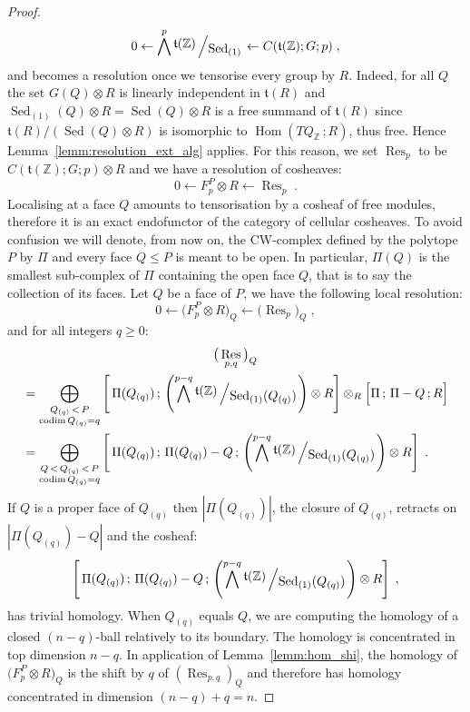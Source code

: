 \documentclass[AHL,Unicode,longabstracts,published]{cedram}
\newcommand{\bigslant}[2]{{\raisebox{.2em}{$#1$}\left/\raisebox{-.2em}{$#2$}\right.}}
\newcommand{\Z}{\mathbb{Z}}
\renewcommand{\t}{\mathfrak{t}}
\DeclareMathOperator{\Sed}{Sed}
\DeclareMathOperator{\codim}{codim}
\DeclareMathOperator{\Res}{Res}
\DeclareMathOperator{\Hom}{Hom}
\begin{document}
\begin{proof}
\begin{equation*}
0\leftarrow \bigwedge^p \bigslant{\t(\Z)}{\Sed_{(1)}} \leftarrow C(\t(\Z);G;p)\;,
\end{equation*}
and becomes a resolution once we tensorise every group by $R$. Indeed, for all $Q$ the set $G(Q)\otimes R$ is linearly independent in $\t(R)$ and $\Sed_{(1)}(Q)\otimes R=\Sed(Q)\otimes R$ is a free summand of $\t(R)$ since $\t(R)/(\Sed(Q)\otimes R)$ is isomorphic to $\Hom(TQ_\Z\,;R)$, thus free. Hence Lemma~\ref{lemm:resolution_ext_alg} applies. For this reason, we set $\Res_p$ to be $C(\t(\Z);G;p)\otimes R$ and we have a resolution of cosheaves:
\begin{equation}\label{eq:resolution_F_xxx}
\tag{R}
0\leftarrow F^P_p\otimes R \leftarrow \Res_p\;.
\end{equation}
Localising at a face $Q$ amounts to tensorisation by a cosheaf of free modules, therefore it is an exact endofunctor of the category of cellular cosheaves. To avoid confusion we will denote, from now on, the CW-complex defined by the polytope $P$ by $\Pi$ and every face $Q\leq P$ is meant to be open. In particular, $\Pi(Q)$ is the smallest sub-complex of $\Pi$ containing the open face $Q$, that is to say the collection of its faces. Let $Q$ be a face of $P$, we have the following local resolution:
\begin{equation*}
0\leftarrow \big(F^{P}_p\otimes R\big)_Q \leftarrow \big(\Res_p\big)_Q\;,
\end{equation*}
and for all integers $q\geq 0$:
\begin{multline*}
\big(\Res_{p,q}\big)_Q\\
\begin{aligned}
&= \bigoplus_{\substack{Q_{(q)}\,<\,P \\ \codim Q_{(q)} =q}} \left[\, \Pi(Q_{(q)})\,;\, \left(\bigwedge^{p-q}\bigslant{\t(\Z)}{\Sed_{(1)}(Q_{(q)})}\right)\otimes R \right]\otimes_R \Big[\Pi \,;\,\Pi-Q\,;R\Big]\\%
&= \bigoplus_{\substack{Q\,<\,Q_{(q)}\,<\,P \\ \codim Q_{(q)} =q}} \left[\, \Pi(Q_{(q)})\,;\,\Pi(Q_{(q)})-Q\,;\, \left(\bigwedge^{p-q}\bigslant{\t(\Z)}{\Sed_{(1)}(Q_{(q)})}\right)\otimes R \right]\;.
\end{aligned}
\end{multline*}
If $Q$ is a proper face of ${Q_{(q)}}$ then $|\Pi(Q_{(q)})|$, the closure of ${Q_{(q)}}$, retracts on $|\Pi(Q_{(q)})-Q|$ and the cosheaf:
\begin{equation*}
\left[\, \Pi(Q_{(q)})\,;\,\Pi(Q_{(q)})-Q\,;\, \left(\bigwedge^{p-q}\bigslant{\t(\Z)}{\Sed_{(1)}(Q_{(q)})}\right)\otimes R \right]\;,
\end{equation*}
has trivial homology. When $Q_{(q)}$ equals $Q$, we are computing the homology of a closed $(n-q)$-ball relatively to its boundary. The homology is concentrated in top dimension $n-q$. In application of Lemma~\ref{lemm:hom_shi}, the homology of $\big(F^{P}_p\otimes R\big)_Q$ is the shift by $q$ of $(\Res_{p,q})_Q$ and therefore has homology concentrated in dimension $(n-q)+q=n$.
\end{proof}
\end{document}
